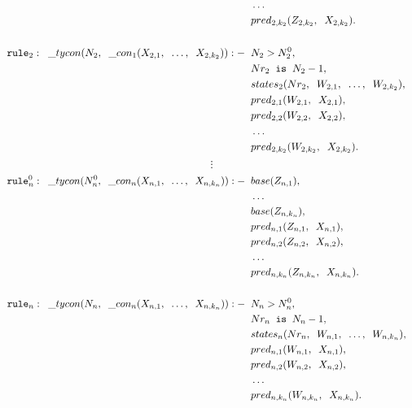 \begin{align*}
	  & \;\; \ldots \;\;                                                &   &   \\
	  & \;\; pred_{2, k_2}(Z_{2,k_2}, \;\; X_{2,k_2}).                  &   &   \\
	\\
	\texttt{rule}_2: \;\; \_ tycon (N_2, \;\; \_ con_1(X_{2,1}, \;\; \ldots, \;\; X_{2,k_2})) :-
	  & \;\; N_2 > N_{2}^{0},                                           &   &   \\
	  & \;\; Nr_2 \;\; \texttt{is} \;\; N_2 - 1,                           &   &   \\
	  & \;\; states_2(Nr_2, \;\; W_{2,1}, \;\; \ldots, \;\; W_{2,k_2}), &   &   \\
	  & \;\; pred_{2, 1}(W_{2,1}, \;\; X_{2,1}),                        &   &   \\
	  & \;\; pred_{2, 2}(W_{2,2}, \;\; X_{2,2}),                        &   &   \\
	  & \;\; \ldots \;\;                                                &   &   \\
	  & \;\; pred_{2, k_2}(W_{2,k_2}, \;\; X_{2,k_2}).                  &   &   
\end{align*}
$$\vdots$$
\begin{align*}
	\texttt{rule}_{n}^{0}: \;\; \_ tycon (N_{n}^{0}, \;\; \_ con_n(X_{n,1}, \;\; \ldots, \;\; X_{n,k_n})) :-
	  & \;\; base(Z_{n,1}),                                             &   &   \\
	  & \;\; \ldots                                                     &   &   \\
	  & \;\; base(Z_{n,k_n}),                                           &   &   \\
	  & \;\; pred_{n, 1}(Z_{n,1}, \;\; X_{n,1}),                        &   &   \\
	  & \;\; pred_{n, 2}(Z_{n,2}, \;\; X_{n,2}),                        &   &   \\
	  & \;\; \ldots \;\;                                                &   &   \\
	  & \;\; pred_{n, k_n}(Z_{n,k_n}, \;\; X_{n,k_n}).                  &   &   \\
	\\
	\texttt{rule}_n: \;\; \_ tycon (N_n, \;\; \_ con_n(X_{n,1}, \;\; \ldots, \;\; X_{n,k_n})) :-
	  & \;\; N_n > N_{n}^{0},                                           &   &   \\
	  & \;\; Nr_n \;\; \texttt{is} \;\; N_n - 1,                           &   &   \\
	  & \;\; states_n(Nr_n, \;\; W_{n,1}, \;\; \ldots, \;\; W_{n,k_n}), &   &   \\
	  & \;\; pred_{n, 1}(W_{n,1}, \;\; X_{n,1}),                        &   &   \\
	  & \;\; pred_{n, 2}(W_{n,2}, \;\; X_{n,2}),                        &   &   \\
	  & \;\; \ldots \;\;                                                &   &   \\
	  & \;\; pred_{n, k_n}(W_{n,k_n}, \;\; X_{n,k_n}).                  &   &   \\
\end{align*}

